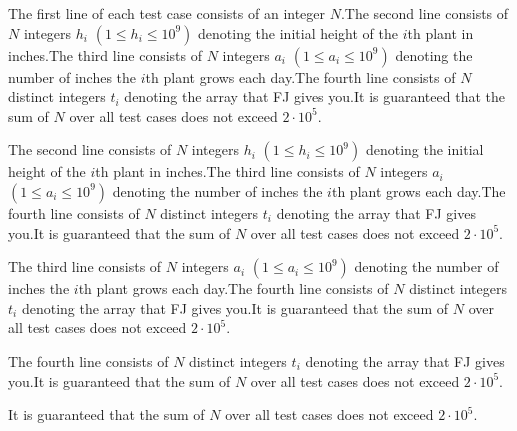 \documentclass[12pt]{article}
\begin{document}
The first line of each test case consists of an integer $N$.The second line consists of $N$ integers $h_i$ $(1 \leq h_i \leq 10^9)$ denoting
the initial height of the $i$th plant in inches.The third line consists of $N$ integers $a_i$ $(1 \leq a_i \leq 10^9)$ denoting
the number of inches the $i$th plant grows each day.The fourth line consists of $N$ distinct integers $t_i$ denoting the array that
FJ gives you.It is guaranteed that the sum of $N$ over all test cases does not exceed
$2\cdot 10^5$.

The second line consists of $N$ integers $h_i$ $(1 \leq h_i \leq 10^9)$ denoting
the initial height of the $i$th plant in inches.The third line consists of $N$ integers $a_i$ $(1 \leq a_i \leq 10^9)$ denoting
the number of inches the $i$th plant grows each day.The fourth line consists of $N$ distinct integers $t_i$ denoting the array that
FJ gives you.It is guaranteed that the sum of $N$ over all test cases does not exceed
$2\cdot 10^5$.

The third line consists of $N$ integers $a_i$ $(1 \leq a_i \leq 10^9)$ denoting
the number of inches the $i$th plant grows each day.The fourth line consists of $N$ distinct integers $t_i$ denoting the array that
FJ gives you.It is guaranteed that the sum of $N$ over all test cases does not exceed
$2\cdot 10^5$.

The fourth line consists of $N$ distinct integers $t_i$ denoting the array that
FJ gives you.It is guaranteed that the sum of $N$ over all test cases does not exceed
$2\cdot 10^5$.

It is guaranteed that the sum of $N$ over all test cases does not exceed
$2\cdot 10^5$.
\end{document}
